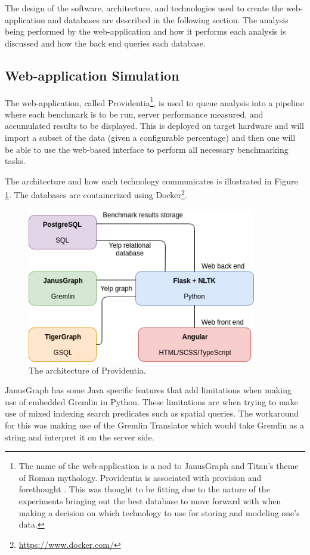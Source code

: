 The design of the software, architecture, and technologies used to create the web-application and databases are described in the following section. The analysis being performed by the web-application and how it performs each analysis is discussed and how the back end queries each database.

\subsection{Web-application Simulation}
The web-application, called Providentia\footnote{The name of the web-application is a nod to JanusGraph and Titan's theme of Roman mythology. Providentia is associated with provision and forethought \cite{providentia-meaning}. This was thought to be fitting due to the nature of the experiments bringing out the best database to move forward with when making a decision on which technology to use for storing and modeling one's data.}, is used to queue analysis into a pipeline where each benchmark is to be run, server performance measured, and accumulated results to be displayed. This is deployed on target hardware and will import a subset of the data (given a configurable percentage) and then one will be able to use the web-based interface to perform all necessary benchmarking tasks.

The architecture and how each technology communicates is illustrated in Figure \ref{fig:providentia-architecture}. The databases are containerized using Docker\footnote{\url{https://www.docker.com/}}. 

\begin{figure}[h!]
    \centering
    \includegraphics[width=10cm]{img/providentia-architecture.png}
    \caption{The architecture of Providentia.}
    \label{fig:providentia-architecture}
\end{figure}

JanusGraph has some Java specific features that add limitations when making use of embedded Gremlin in Python. These limitations are when trying to make use of mixed indexing search predicates such as spatial queries. The workaround for this was making use of the Gremlin Translator which would take Gremlin as a string and interpret it on the server side.

